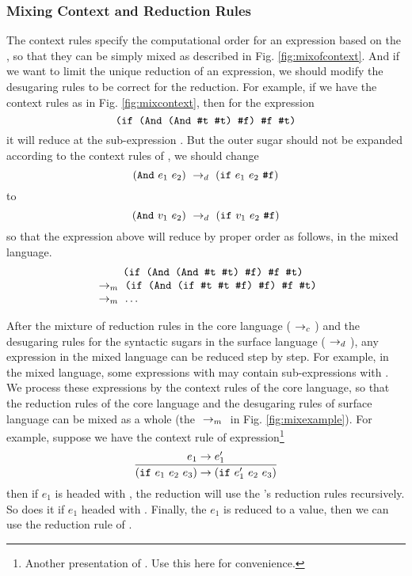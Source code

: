 \subsubsection{Mixing Context and Reduction Rules}

The context rules specify the computational order for an expression based on the , so that they can be simply mixed as described in Fig. \ref{fig:mixofcontext}. And if we want to limit the unique reduction of an expression, we should modify the desugaring rules to be correct for the reduction. For example, if we have the context rules as in Fig. \ref{fig:mixcontext}, then for the expression
\[
	\texttt{(if (And (And \#t~\#t) \#f) \#f~\#t)}
\]
it will reduce at the sub-expression . But the outer  sugar should not be expanded according to the context rules of , we should change
\[
	(\mbox{\tt And}~e_1~e_2) ~\rightarrow_d~ (\mbox{\tt if}~e_1~e_2~\mbox{\tt \#f})
\]
to
\[
	(\mbox{\tt And}~v_1~e_2) ~\rightarrow_d~ (\mbox{\tt if}~v_1~e_2~\mbox{\tt \#f})
\]
so that the expression above will reduce by proper order as follows, in the mixed language.
\[
	\begin{array}{l}
		\qquad\texttt{  (if (And (And \#t~\#t) \#f) \#f~\#t)}\\
		~\rightarrow_m~\texttt{(if (And (if \#t~\#t~\#f) \#f) \#f~\#t)}\\
		~\rightarrow_m~\texttt{$\ldots$}
	\end{array}
\]

After the mixture of reduction rules in the core language ($~\rightarrow_c~$) and the  desugaring rules for the syntactic sugars in the surface language ($~\rightarrow_d~$), any expression in the mixed language can be reduced step by step. For example, in the mixed language, some expressions with  may contain sub-expressions with . We process these expressions by the context rules of the core language, so that the reduction rules of the core language and the desugaring rules of surface language can be mixed as a whole
 (the $~\rightarrow_m~$ in Fig. \ref{fig:mixexample}). For example, suppose we have the context rule of  expression\footnote{Another presentation of . Use this here for convenience.}
\[
\infer{(\m{if}~e_1~e_2~e_3) \rightarrow (\m{if}~e_1'~e_2~e_3)}{e_1 \rightarrow e_1'}
\]
then if $e_1$ is headed with , the reduction will use the 's reduction rules recursively. So does it if $e_1$ headed with . Finally, the $e_1$ is reduced to a value, then we can use the reduction rule of .
